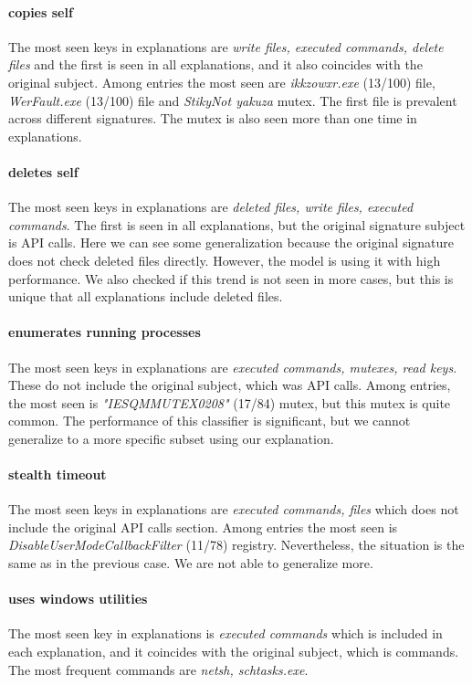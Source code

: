 \paragraph{copies self}
The most seen keys in explanations are \emph{write files, executed commands, delete files} and the first is seen in all explanations, and it also coincides with the original subject. Among entries the most seen are \emph{ikkzowxr.exe} (13/100) file, \emph{WerFault.exe} (13/100) file and \emph{StikyNot yakuza} mutex. The first file is prevalent across different signatures. The mutex is also seen more than one time in explanations.

\paragraph{deletes self}
The most seen keys in explanations are \emph{deleted files, write files, executed commands}. The first is seen in all explanations, but the original signature subject is API calls. Here we can see some generalization because the original signature does not check deleted files directly. However, the model is using it with high performance. We also checked if this trend is not seen in more cases, but this is unique that all explanations include deleted files.

\paragraph{enumerates running processes}
The most seen keys in explanations are \emph{executed commands, mutexes, read keys}. These do not include the original subject, which was API calls.  Among entries, the most seen is \emph{"IESQMMUTEX0208"} (17/84) mutex, but this mutex is quite common. The performance of this classifier is significant, but we cannot generalize to a more specific subset using our explanation.

\paragraph{stealth timeout}
The most seen keys in explanations are \emph{executed commands, files} which does not include the original API calls section. Among entries the most seen is \emph{DisableUserModeCallbackFilter} (11/78) registry. Nevertheless, the situation is the same as in the previous case. We are not able to generalize more.

\paragraph{uses windows utilities}
The most seen key in explanations is \emph{executed commands} which is included in each explanation, and it coincides with the original subject, which is commands. The most frequent commands are \emph{netsh, schtasks.exe}.

